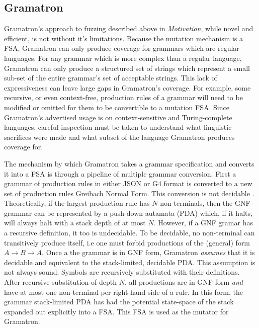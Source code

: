 \documentclass[12pt]{diazessay}
\begin{document}
\subsection*{Gramatron}

Gramatron's approach to fuzzing described above in \emph{Motivation}, while novel and efficient, is not without it's limitations.
Because the mutation mechanism is a FSA, Gramatron can only produce coverage for grammars which are regular languages.
For any grammar which is more complex than a regular language, Gramatron can only produce a structured set of strings which represent a small sub-set of the entire grammar's set of acceptable strings.
This lack of expressiveness can leave large gaps in Gramatron's coverage.
For example, some recursive, or even context-free, production rules of a grammar will need to be modified or omitted for them to be convertible to a mutation FSA.
Since Gramatron's advertised usage is on context-sensitive and Turing-complete languages, careful inspection must be taken to understand what linguistic sacrifices were made and what subset of the language Gramatron produces coverage for.

The mechanism by which Gramatron takes a grammar specification and converts it into a FSA is through a pipeline of multiple grammar conversion.
First a grammar of production rules in either JSON or G4\cite{parr2013definitive} format is converted to a new set of production rules Greibach Normal Form.
This conversion is not decidable \cite{yu1997regular}.
Theoretically, if the largest production rule has $N$ non-terminals, then the GNF grammar can be represented by a push-down autamata (PDA) which, if it halts, will always halt with a stack depth of at most $N$.
However, if a GNF gramar has a recursive definition, it too is undecidable.
To be decidable, no non-terminal can transitively produce itself, i.e one must forbid productions of the (general) form $A \to B \to A$.
Once a the grammar is in GNF form, Gramatron \emph{assumes} that it is decidable and equivalent to the stack-limited, decidable PDA.
This assumption is not always sound.
Symbols are recursively substituted with their definitions.
After recursive substitution of depth $N$, all productions are in GNF form \emph{and} have at most one non-terminal per right-hand-side of a rule.
In this form, the grammar stack-limited PDA has had the potential state-space of the stack expanded out explicitly into a FSA.
This FSA is used as the mutator for Gramatron.
\end{document}
